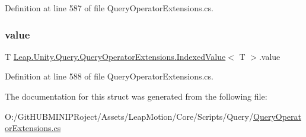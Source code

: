 Definition at line 587 of file Query\+Operator\+Extensions.\+cs.

\mbox{\label{struct_leap_1_1_unity_1_1_query_1_1_query_operator_extensions_1_1_indexed_value_a004f3cc90fa8d564bf5d1fb2f0124fc0}} 
\subsubsection{\texorpdfstring{value}{value}}
{\footnotesize\ttfamily T \mbox{\hyperlink{struct_leap_1_1_unity_1_1_query_1_1_query_operator_extensions_1_1_indexed_value}{Leap.\+Unity.\+Query.\+Query\+Operator\+Extensions.\+Indexed\+Value}}$<$ T $>$.value}



Definition at line 588 of file Query\+Operator\+Extensions.\+cs.



The documentation for this struct was generated from the following file\+:\begin{DoxyCompactItemize}
\item 
O\+:/\+Git\+H\+U\+B\+M\+I\+N\+I\+P\+Roject/\+Assets/\+Leap\+Motion/\+Core/\+Scripts/\+Query/\mbox{\hyperlink{_query_operator_extensions_8cs}{Query\+Operator\+Extensions.\+cs}}\end{DoxyCompactItemize}
